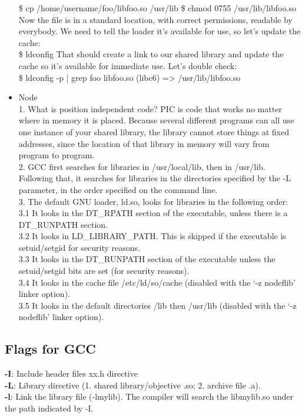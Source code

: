 \documentclass[a4paper, 12pt]{article}
\begin{document}
\begin{itemize}
            \textsf{
                \$ cp /home/username/foo/libfoo.so /usr/lib
                \$ chmod 0755 /usr/lib/libfoo.so
            }\\
            Now the file is in a standard location, with correct permissions, readable by everybody. We need to tell the loader it’s available for use, so let’s update the cache:\\
            \textsf{\$ ldconfig}
            That should create a link to our shared library and update the cache so it’s available for immediate use. Let’s double check:\\
            \textsf{\$ ldconfig -p | grep foo
            libfoo.so (libc6) => /usr/lib/libfoo.so}
        \item Node\\
            1. What is position independent code? PIC is code that works no matter where in memory it is placed. Because several different programs can all use one instance of your shared library, the library cannot store things at fixed addresses, since the location of that library in memory will vary from program to program.\\
            2. GCC first searches for libraries in /usr/local/lib, then in /usr/lib. Following that, it searches for libraries in the directories specified by the -L parameter, in the order specified on the command line.\\
            \textsf{
            3. The default GNU loader, ld.so, looks for libraries in the following order:\\
            3.1 It looks in the DT\_RPATH section of the executable, unless there is a DT\_RUNPATH section.\\
            3.2 It looks in LD\_LIBRARY\_PATH. This is skipped if the executable is setuid/setgid for security reasons.\\
            3.3 It looks in the DT\_RUNPATH section of the executable unless the setuid/setgid bits are set (for security reasons).\\
            3.4 It looks in the cache file /etc/ld/so/cache (disabled with the ‘-z nodeflib’ linker option).\\
            3.5 It looks in the default directories /lib then /usr/lib (disabled with the ‘-z nodeflib’ linker option).}\\

    \end{itemize}
    \subsection{Flags for GCC} 
    \textbf{-I}: Include header files xx.h directive\\
    \textbf{-L}: Library directive (1. shared library/objective .so; 2. archive file .a).\\
    \textbf{-l}: Link the library file (-lmylib). The compiler will search the libmylib.so under the path indicated by -I.
\end{document}
